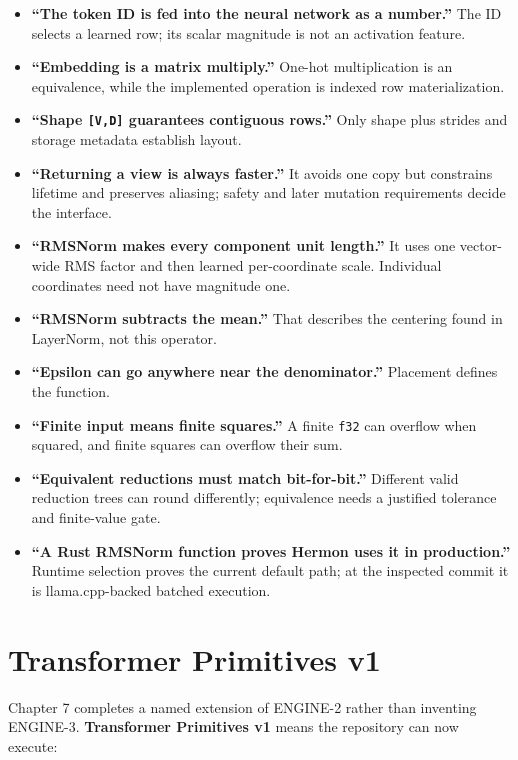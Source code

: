 \begin{itemize}
\tightlist
\item
  \textbf{``The token ID is fed into the neural network as a number.''}
  The ID selects a learned row; its scalar magnitude is not an
  activation feature.
\item
  \textbf{``Embedding is a matrix multiply.''} One-hot multiplication is
  an equivalence, while the implemented operation is indexed row
  materialization.
\item
  \textbf{``Shape \texttt{{[}V,D{]}} guarantees contiguous rows.''} Only
  shape plus strides and storage metadata establish layout.
\item
  \textbf{``Returning a view is always faster.''} It avoids one copy but
  constrains lifetime and preserves aliasing; safety and later mutation
  requirements decide the interface.
\item
  \textbf{``RMSNorm makes every component unit length.''} It uses one
  vector-wide RMS factor and then learned per-coordinate scale.
  Individual coordinates need not have magnitude one.
\item
  \textbf{``RMSNorm subtracts the mean.''} That describes the centering
  found in LayerNorm, not this operator.
\item
  \textbf{``Epsilon can go anywhere near the denominator.''} Placement
  defines the function.
\item
  \textbf{``Finite input means finite squares.''} A finite \texttt{f32}
  can overflow when squared, and finite squares can overflow their sum.
\item
  \textbf{``Equivalent reductions must match bit-for-bit.''} Different
  valid reduction trees can round differently; equivalence needs a
  justified tolerance and finite-value gate.
\item
  \textbf{``A Rust RMSNorm function proves Hermon uses it in
  production.''} Runtime selection proves the current default path; at
  the inspected commit it is llama.cpp-backed batched execution.
\end{itemize}

\section{Transformer Primitives v1}\label{transformer-primitives-v1}

Chapter 7 completes a named extension of ENGINE-2 rather than inventing
ENGINE-3. \textbf{Transformer Primitives v1} means the repository can
now execute:

